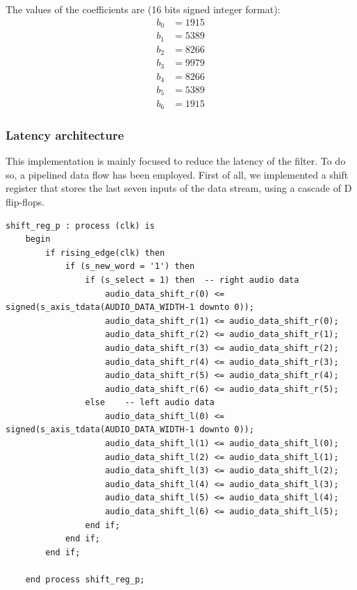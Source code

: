 \documentclass[11pt, a4paper]{article}
\begin{document}
The values of the coefficients are (16 bits signed integer format):
\begin{align*}
    b_0 &= 1915  \\
    b_1 &= 5389  \\
    b_2 &= 8266  \\
    b_3 &= 9979  \\
    b_4 &= 8266  \\
    b_5 &= 5389  \\
    b_6 &= 1915
\end{align*}

\subsubsection{Latency architecture}
This implementation is mainly focused to reduce the latency of the filter. To do so, a pipelined data flow has been employed.
First of all, we implemented a shift register that stores the last seven inputs of the data stream, using a cascade of D flip-flops.

\begin{lstlisting}[style={VHDL-style}]
shift_reg_p : process (clk) is
    begin
        if rising_edge(clk) then
            if (s_new_word = '1') then
                if (s_select = 1) then  -- right audio data 
                    audio_data_shift_r(0) <= signed(s_axis_tdata(AUDIO_DATA_WIDTH-1 downto 0));
                    audio_data_shift_r(1) <= audio_data_shift_r(0);
                    audio_data_shift_r(2) <= audio_data_shift_r(1);
                    audio_data_shift_r(3) <= audio_data_shift_r(2);
                    audio_data_shift_r(4) <= audio_data_shift_r(3);
                    audio_data_shift_r(5) <= audio_data_shift_r(4);
                    audio_data_shift_r(6) <= audio_data_shift_r(5);
                else    -- left audio data
                    audio_data_shift_l(0) <= signed(s_axis_tdata(AUDIO_DATA_WIDTH-1 downto 0));
                    audio_data_shift_l(1) <= audio_data_shift_l(0);
                    audio_data_shift_l(2) <= audio_data_shift_l(1);
                    audio_data_shift_l(3) <= audio_data_shift_l(2);
                    audio_data_shift_l(4) <= audio_data_shift_l(3);
                    audio_data_shift_l(5) <= audio_data_shift_l(4);
                    audio_data_shift_l(6) <= audio_data_shift_l(5);
                end if;
            end if;
        end if;

    end process shift_reg_p;
\end{lstlisting}
\end{document}
